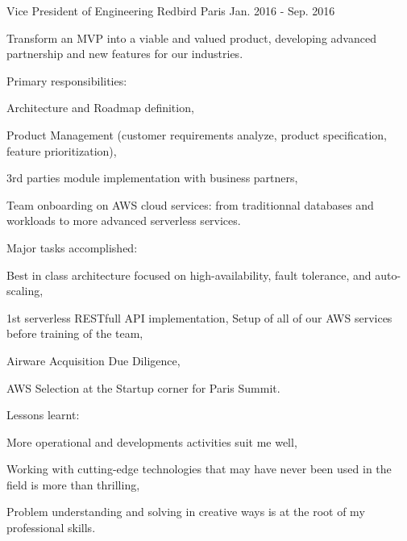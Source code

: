 \begin{cventries}
  \cventry
    {Vice President of Engineering} %
    {Redbird} %
    {Paris} %
    {Jan. 2016 - Sep. 2016} %
    {
      \begin{cvitems} %
        \item {Transform an MVP into a viable and valued product, developing advanced partnership and new features for our industries.}
        \item {Primary responsibilities:} %
        \begin{cvsubitems}
          \item {Architecture and Roadmap definition,}
          \item {Product Management (customer requirements analyze, product specification, feature prioritization),}
          \item {3rd parties module implementation with business partners,}
          \item {Team onboarding on AWS cloud services: from traditionnal databases and workloads to more advanced serverless services.}
        \end{cvsubitems}
        \item {Major tasks accomplished:}
        \begin{cvsubitems}
          \item {Best in class architecture focused on high-availability, fault tolerance, and auto-scaling,}
          \item {1st serverless RESTfull API implementation, Setup of all of our AWS services before training of the team,}
          \item {Airware Acquisition Due Diligence,}
          \item {AWS Selection at the Startup corner for Paris Summit.}
        \end{cvsubitems}
        \item {Lessons learnt:}
        \begin{cvsubitems}
          \item {More operational and developments activities suit me well,}
          \item {Working with cutting-edge technologies that may have never been used in the field is more than thrilling,}
          \item {Problem understanding and solving in creative ways is at the root of my professional skills.}
        \end{cvsubitems}
      \end{cvitems}
    }


\end{cventries}

